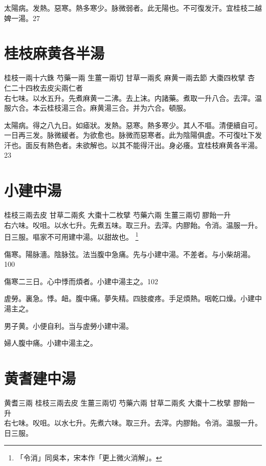太陽病。发熱。惡寒。熱多寒少。脉微弱者。此无陽也。不可{\khaaitp 復}发汗。{\khaaitp 宜桂枝二越婢一湯。}27

\section{桂枝麻黄各半湯}

桂枝{\scriptsize 一兩十六銖} 芍藥{\scriptsize 一兩} 生薑{\scriptsize 一兩切} 甘草{\scriptsize 一兩炙} 麻黄{\scriptsize 一兩去節} 大棗{\scriptsize 四枚擘} 杏仁{\scriptsize 二十四枚去皮尖兩仁者}\\
右七味。以水五升。先煮麻黄一二沸。去上沫。内諸藥。煮取一升八合。去滓。温服六合。本云桂枝湯三合。麻黄湯三合。并为六合。頓服。

太陽病。得之八九日。如瘧狀。发熱。惡寒。熱多寒少。其人不嘔。清便續自可。一日再三发。脉微緩者。为欲愈也。脉微而惡寒者。此为陰陽俱虗。不可復{\khaaitp 吐下}发汗也。面反有熱色者。未欲解也。以其不能得汗出。身必癢。宜桂枝麻黄各半湯。23

\section{小建中湯}

桂枝{\scriptsize 三兩去皮} 甘草{\scriptsize 二兩炙} 大棗{\scriptsize 十二枚擘} 芍藥{\scriptsize 六兩} 生薑{\scriptsize 三兩切} 膠飴{\scriptsize 一升}\\
右六味。{\khaaitp 㕮咀。}以水七升。{\khaaitp 先}煮{\khaaitp 五味。}取三升。去滓。内{\khaaitp 膠}飴。令消。温服一升。日三服。嘔家不可用建中湯。以甜故也。
	\footnote{
		「令消」同吳本，宋本作「更上微火消解」。
	}

傷寒。陽脉濇。陰脉弦。法当腹中急痛。先与小建中湯。不差者。与小柴胡湯。100

傷寒二三日。心中悸而煩者。小建中湯主之。102

虗勞。裏急。悸。衄。腹中痛。夢失精。四肢痠疼。手足煩熱。咽乾口燥。小建中湯主之。

男子黄。小便自利。当与虗勞小建中湯。

婦人腹中痛。小建中湯主之。

\section{黄耆建中湯}

黄耆{\scriptsize 三兩} 桂枝{\scriptsize 三兩去皮} 生薑{\scriptsize 三兩切} 芍藥{\scriptsize 六兩} 甘草{\scriptsize 二兩炙} 大棗{\scriptsize 十二枚擘} 膠飴{\scriptsize 一升}\\
右七味。㕮咀。以水七升。先煮六味。取三升。去滓。内膠飴。令消。温服一升。日三服。

